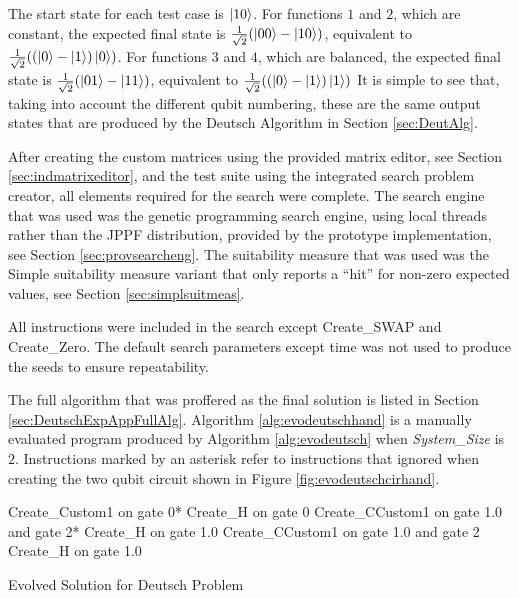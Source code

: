 The start state for each test case is $\left\vert{10}\right\rangle$.
For functions $1$ and $2$, which are constant, the expected final state is $\frac{1}{\sqrt{2}}(\left\vert{00}\right\rangle-\left\vert{10}\right\rangle)$, equivalent to $\frac{1}{\sqrt{2}}((\left\vert{0}\right\rangle-\left\vert{1}\right\rangle)\left\vert{0}\right\rangle)$.
For functions $3$ and $4$, which are balanced, the expected final state is $\frac{1}{\sqrt{2}}(\left\vert{01}\right\rangle-\left\vert{11}\right\rangle)$, equivalent to $\frac{1}{\sqrt{2}}((\left\vert{0}\right\rangle-\left\vert{1}\right\rangle)\left\vert{1}\right\rangle)$
It is simple to see that, taking into account the different qubit numbering, these are the same output states that are produced by the Deutsch Algorithm in Section \ref{sec:DeutAlg}.

After creating the custom matrices using the provided matrix editor, see Section \ref{sec:indmatrixeditor}, and the test suite using the integrated search problem creator, all elements required for the search were complete.
The search engine that was used was the genetic programming search engine, using local threads rather than the JPPF distribution, provided by the prototype implementation, see Section \ref{sec:provsearcheng}.
The suitability measure that was used was the Simple suitability measure variant that only reports a ``hit'' for non-zero expected values, see Section \ref{sec:simplsuitmeas}.

All instructions were included in the search except Create\_SWAP and Create\_Zero.
The default search parameters except time was not used to produce the seeds to ensure repeatability.

The full algorithm that was proffered as the final solution is listed in Section \ref{sec:DeutschExpAppFullAlg}.
Algorithm \ref{alg:evodeutschhand} is a manually evaluated program produced by Algorithm \ref{alg:evodeutsch} when \emph{System\_Size} is $2$.
Instructions marked by an asterisk refer to instructions that ignored when creating the two qubit circuit shown in Figure \ref{fig:evodeutschcirhand}.

\begin{algorithm}
 \begin{algorithmic}
\STATE Create\_Custom1 on gate 0*
\STATE Create\_H on gate 0
\STATE Create\_CCustom1 on gate 1.0 and gate 2*
\STATE Create\_H on gate 1.0
\STATE Create\_CCustom1 on gate 1.0 and gate 2
\STATE Create\_H on gate 1.0
 \end{algorithmic}
\caption{Evolved Solution for Deutsch Problem}
\label{alg:evodeutschhand}
\end{algorithm}

\begin{lstlisting}
\end{lstlisting}

